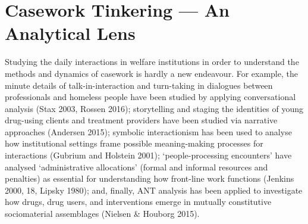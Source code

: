 \chapter{Casework Tinkering --- An Analytical Lens}
Studying the daily interactions in welfare institutions in order to understand the methods and dynamics of casework is hardly a new endeavour. For example, the minute details of talk-in-interaction and turn-taking in dialogues between professionals and homeless people have been studied by applying conversational analysis (Stax 2003, Rossen 2016); storytelling and staging the identities of young drug-using clients and treatment providers have been studied via narrative approaches (Andersen 2015); symbolic interactionism has been used to analyse how institutional settings frame possible meaning-making processes for interactions (Gubrium and Holstein 2001); ‘people-processing encounters’ have analysed ‘administrative allocations’ (formal and informal resources and penalties) as essential for understanding how front-line work functions (Jenkins 2000, 18, Lipsky 1980); and, finally, ANT analysis has been applied to investigate how drugs, drug users, and interventions emerge in mutually constitutive sociomaterial assemblages (Nielsen \& Houborg 2015).
\par
